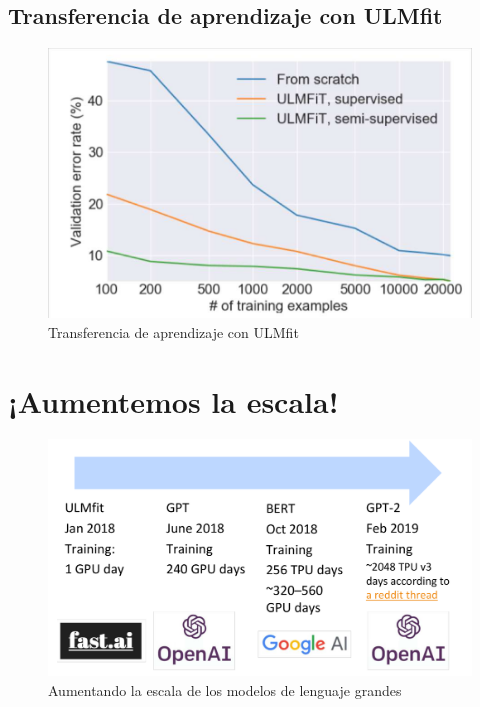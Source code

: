 \subsection{Transferencia de aprendizaje con ULMfit}

\begin{figure}[h]
  \centering
  \includegraphics[scale=0.3]{pics/ulmfit4.png}
  \caption{Transferencia de aprendizaje con ULMfit}
\end{figure}

\section{¡Aumentemos la escala!}

\begin{figure}[h]
  \centering
  \includegraphics[scale=0.28]{pics/llmscale.png}
  \caption{Aumentando la escala de los modelos de lenguaje grandes}
\end{figure}

